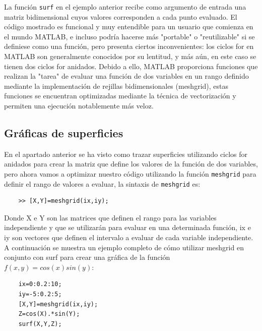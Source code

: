 La función \texttt{surf} en el ejemplo anterior recibe como argumento de entrada una matriz bidimensional 
cuyos valores corresponden a cada punto evaluado. El código mostrado es funcional y muy entendible 
para un usuario que comienza en el mundo MATLAB, e incluso podría hacerse más "portable" o "reutilizable" 
si se definiese como una función, pero presenta ciertos inconvenientes: los ciclos for en MATLAB son 
generalmente conocidos por su lentitud, y más aún, en este caso se tienen dos ciclos for anidados. 
Debido a ello, MATLAB proporciona funciones que realizan la "tarea" de evaluar una función de dos 
variables en un rango definido mediante la implementación de rejillas bidimensionales (meshgrid), estas 
funciones se encuentran optimizadas mediante la técnica de vectorización y permiten una ejecución 
notablemente más veloz.

\subsection{Gráficas de superficies}

En el apartado anterior se ha visto como trazar superficies utilizando ciclos for anidados para crear 
la matriz que define los valores de la función de dos variables, pero ahora vamos a optimizar nuestro 
código utilizando la función \texttt{meshgrid} para definir el rango de valores a evaluar, la sintaxis 
de \texttt{meshgrid} es:

\begin{verbatim}
	>> [X,Y]=meshgrid(ix,iy);
\end{verbatim}

Donde X e Y son las matrices que definen el rango para las variables independiente y que se utilizarán 
para evaluar en una determinada función, ix e iy son vectores que definen el intervalo a evaluar de 
cada variable independiente. A continuación se muestra un ejemplo completo de cómo utilizar meshgrid 
en conjunto con surf para crear una gráfica de la función $f(x,y)=cos(x) sin(y)$:

\begin{verbatim}
	ix=0:0.2:10;
	iy=-5:0.2:5;
	[X,Y]=meshgrid(ix,iy);
	Z=cos(X).*sin(Y);
	surf(X,Y,Z);
\end{verbatim}

